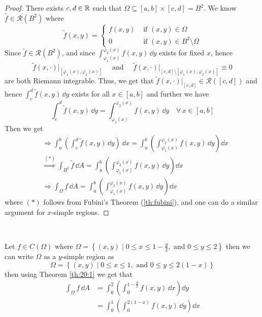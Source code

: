 \documentclass[../Analysis-3.tex]{subfiles}
\begin{document}
\begin{proof}
  There exists $c,d \in \mathbb{R}$ such that $\Omega \subseteq [a,b] \times [c,d] = B^2$. We know $\tilde{f} \in \mathscr{R}(B^2)$ where
  \[
    \tilde{f}(x,y) = \begin{cases}
      f(x,y) & \mbox{ if } (x,y) \in \Omega               \\
      0      & \mbox{ if } (x,y) \in B^2 \setminus \Omega
    \end{cases}
  \]
  Since $\tilde{f} \in \mathscr{R}(B^2)$, and since $\displaystyle{\int_{\varphi_1(x)}^{\varphi_2(x)} f(x,y) \, \dd y}$ exists for fixed $x$, hence
  \[
    \tilde{f}(x,\cdot)\big\vert_{[\varphi_1(x),\varphi_2(x)]} \quad \mbox{ and } \quad \tilde{f}(x,\cdot)\big\vert_{[c,d]\setminus[\varphi_1(x),\varphi_2(x)]} \equiv 0
  \]
  are both Riemann integrable. Thus, we get that $\tilde{f}(x,\cdot)\vert_{[c,d]} \in \mathscr{R}([c,d])$ and hence $\displaystyle{\int_c^d \tilde{f}(x,y) \, \dd y}$ exists for all $x \in [a,b]$ and further we have
  \[
    \int_c^d \tilde{f}(x,y) \, \dd y = \int_{\varphi_1(x)}^{\varphi_2(x)} f(x,y) \, \dd y \quad \forall \, x \in [a,b]
  \]
  Then we get
  \begin{align*}
     & \Longrightarrow \int_a^b \left( \int_c^d \tilde{f}(x,y) \, \dd y\right)\, \dd x = \int_a^b \left( \int_{\varphi_1(x)}^{\varphi_2(x)} f(x,y) \, \dd y\right) \dd x \\
     & \overset{(*)}{\Longrightarrow} \int_{B^2} \tilde{f} \, \dd A = \int_a^b \left( \int_{\varphi_1(x)}^{\varphi_2(x)} f(x,y) \, \dd y\right) \dd x                    \\
     & \Longrightarrow \int_{\Omega} f \, \dd A = \int_a^b \left( \int_{\varphi_1(x)}^{\varphi_2(x)} f(x,y) \, \dd y\right) \dd x
  \end{align*}
  where $(*)$ follows from Fubini's Theorem (\ref{th:fubini}), and one can do a similar argument for $x$-simple regions.
\end{proof}

\

\begin{Eg}{}{}
  Let $f \in C(\Omega)$ where $\Omega = \left\{ (x,y) \mid 0 \leq x \leq 1 - \frac{y}{2}, \mbox{ and } 0 \leq y \leq 2 \right\}$ then we can write $\Omega$ as a $y$-simple region as
  \[
    \Omega = \left\{ (x,y) \mid 0 \leq x \leq 1, \mbox{ and } 0 \leq y \leq 2(1-x) \right\}
  \]
  then using Theorem \ref{th:20:1} we get that
  \begin{align*}
    \int_{\Omega} f \, \dd A
     & = \int_0^2 \left( \int_0^{1-\frac{y}{2}} f(x,y) \, \dd x\right) \dd y \\
     & = \int_0^1 \left( \int_0^{2(1-x)} f(x,y) \, \dd y\right) \dd x
  \end{align*}
\end{Eg}
\end{document}
